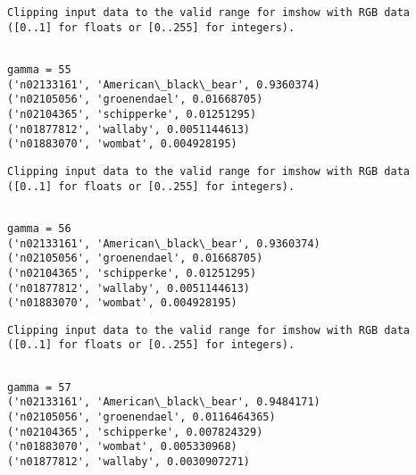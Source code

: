 \documentclass[11pt]{article}
\begin{document}
    \begin{Verbatim}[commandchars=\\\{\}]
Clipping input data to the valid range for imshow with RGB data ([0..1] for floats or [0..255] for integers).

    \end{Verbatim}

    \begin{Verbatim}[commandchars=\\\{\}]

gamma = 55
('n02133161', 'American\_black\_bear', 0.9360374)
('n02105056', 'groenendael', 0.01668705)
('n02104365', 'schipperke', 0.01251295)
('n01877812', 'wallaby', 0.0051144613)
('n01883070', 'wombat', 0.004928195)

    \end{Verbatim}

    \begin{Verbatim}[commandchars=\\\{\}]
Clipping input data to the valid range for imshow with RGB data ([0..1] for floats or [0..255] for integers).

    \end{Verbatim}

    \begin{Verbatim}[commandchars=\\\{\}]

gamma = 56
('n02133161', 'American\_black\_bear', 0.9360374)
('n02105056', 'groenendael', 0.01668705)
('n02104365', 'schipperke', 0.01251295)
('n01877812', 'wallaby', 0.0051144613)
('n01883070', 'wombat', 0.004928195)

    \end{Verbatim}

    \begin{Verbatim}[commandchars=\\\{\}]
Clipping input data to the valid range for imshow with RGB data ([0..1] for floats or [0..255] for integers).

    \end{Verbatim}

    \begin{Verbatim}[commandchars=\\\{\}]

gamma = 57
('n02133161', 'American\_black\_bear', 0.9484171)
('n02105056', 'groenendael', 0.0116464365)
('n02104365', 'schipperke', 0.007824329)
('n01883070', 'wombat', 0.005330968)
('n01877812', 'wallaby', 0.0030907271)

    \end{Verbatim}
\end{document}
